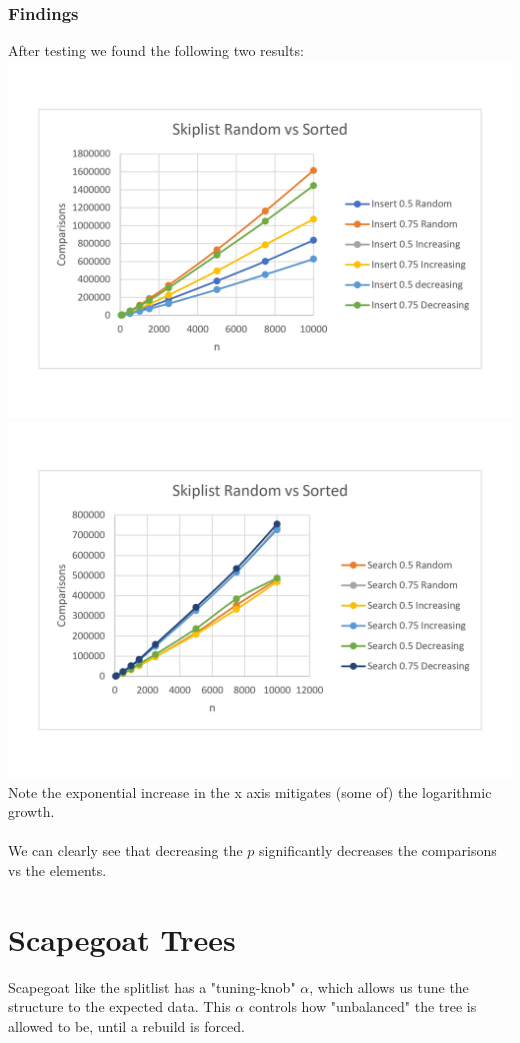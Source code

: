\documentclass[oneside]{scrbook}
\begin{document}
\subsection*{Findings}
After testing we found the following two results:\\
\includegraphics[scale=0.27]{sl-i.jpg}
\includegraphics[scale=0.27]{sl-s.jpg}
Note the exponential increase in the x axis mitigates (some of) the logarithmic growth.
\\\\
We can clearly see that decreasing the $p$ significantly decreases the comparisons vs the elements.

\chapter{Scapegoat Trees}
Scapegoat like the splitlist has a "tuning-knob" $\alpha$, which allows us tune the structure to the expected data.
This $\alpha$ controls how "unbalanced" the tree is allowed to be, until a rebuild is forced.
\end{document}
